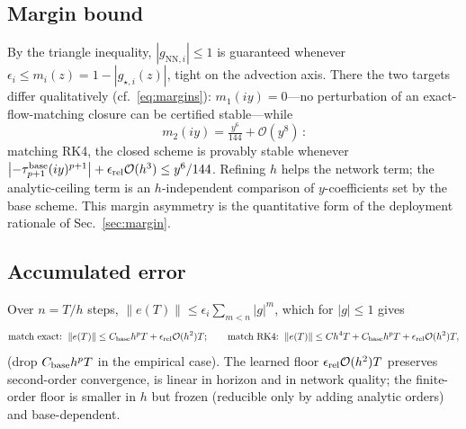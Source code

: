 \documentclass[11pt]{article}
\theoremstyle{plain}
\theoremstyle{definition}
\newcommand{\bO}{\mathcal{O}}
\newcommand{\norm}[1]{\left\lVert #1 \right\rVert}
\begin{document}
\subsection{Margin bound}
By the triangle inequality, $|g_{\mathrm{NN},i}|\le1$ is guaranteed whenever
$\epsilon_i\le m_i(z)=1-|g_{\star,i}(z)|$, tight on the advection axis. There
the two targets differ qualitatively (cf.\ \eqref{eq:margins}):
$m_1(iy)=0$---no perturbation of an exact-flow-matching closure can be
certified stable---while
\begin{equation}
\boxed{\,m_2(iy)=\tfrac{y^6}{144}+\bO(y^8)\,}:
\end{equation}
matching RK4, the closed scheme is provably stable whenever
$\big|{-}\tau^{\rm base}_{p+1}(iy)^{p+1}\big|+\epsilon_{\rm rel}\bO(h^3)
\le y^6/144$. Refining $h$ helps the network term; the analytic-ceiling term
is an $h$-independent comparison of $y$-coefficients set by the base scheme.
This margin asymmetry is the quantitative form of the deployment rationale of
Sec.~\ref{sec:margin}.

\subsection{Accumulated error}
Over $n=T/h$ steps,
$\norm{e(T)}\le\epsilon_i\sum_{m<n}|g|^m$, which for $|g|\le1$ gives
\begin{equation}
\text{match exact: }
\norm{e(T)}\le C_{\rm base}h^pT+\epsilon_{\rm rel}\bO(h^2)T;
\qquad
\text{match RK4: }
\norm{e(T)}\le Ch^4T+C_{\rm base}h^pT+\epsilon_{\rm rel}\bO(h^2)T,
\end{equation}
(drop $C_{\rm base}h^pT$ in the empirical case). The learned floor
$\epsilon_{\rm rel}\bO(h^2)T$ preserves second-order convergence, is linear in
horizon and in network quality; the finite-order floor is smaller in $h$ but
frozen (reducible only by adding analytic orders) and base-dependent.
\end{document}
